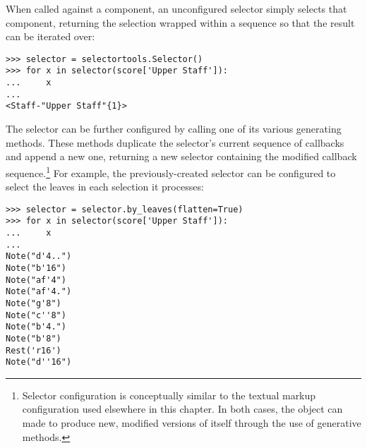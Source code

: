 When called against a component, an unconfigured selector simply selects that
component, returning the selection wrapped within a sequence so that the result
can be iterated over:

\begin{comment}
<abjad>
selector = selectortools.Selector()
for x in selector(score['Upper Staff']):
    x

</abjad>
\end{comment}

\begin{abjadbookoutput}
\begin{singlespacing}
\vspace{-0.5\baselineskip}
\begin{verbatim}
>>> selector = selectortools.Selector()
>>> for x in selector(score['Upper Staff']):
...     x
...
<Staff-"Upper Staff"{1}>
\end{verbatim}
\end{singlespacing}
\end{abjadbookoutput}

\noindent The selector can be further configured by calling one of its various
generating methods. These methods duplicate the selector's current sequence of
callbacks and append a new one, returning a new selector containing the
modified callback sequence.\footnote{Selector configuration is conceptually
similar to the textual markup configuration used elsewhere in this chapter. In
both cases, the object can made to produce new, modified versions of itself
through the use of generative methods.} For example, the previously-created
selector can be configured to select the leaves in each selection it processes:

\begin{comment}
<abjad>
selector = selector.by_leaves(flatten=True)
for x in selector(score['Upper Staff']):
    x

</abjad>
\end{comment}

\begin{abjadbookoutput}
\begin{singlespacing}
\vspace{-0.5\baselineskip}
\begin{verbatim}
>>> selector = selector.by_leaves(flatten=True)
>>> for x in selector(score['Upper Staff']):
...     x
...
Note("d'4..")
Note("b'16")
Note("af'4")
Note("af'4.")
Note("g'8")
Note("c''8")
Note("b'4.")
Note("b'8")
Rest('r16')
Note("d''16")
\end{verbatim}
\end{singlespacing}
\end{abjadbookoutput}

